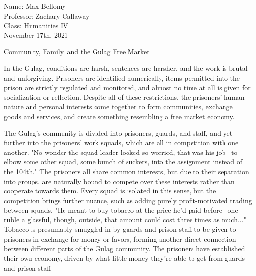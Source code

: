 \documentclass[12pt]{article}
\begin{document}
\begin{flushleft}

Name: Max Bellomy\\
Professor: Zachary Callaway\\
Class: Humanities IV\\
November 17th, 2021\\

\begin{center}
Community, Family, and the Gulag Free Market
\end{center}


\setlength{\parindent}{0.5in}


In the Gulag, conditions are harsh, sentences are harsher, and the work is brutal and unforgiving.
Prisoners are identified numerically, items permitted into the prison are strictly regulated and monitored, and almost no time at all is given for socialization or reflection.
Despite all of these restrictions, the prisoners' human nature and personal interests come together to form communities, exchange goods and services, and create something resembling a free market economy.

The Gulag's community is divided into prisoners, guards, and staff, and yet further into the prisoners' work squads, which are all in competition with one another.
"No wonder the squad leader looked so worried, that was his job-- to elbow some other squad, some bunch of suckers, into the assignment instead of the 104th."\footnotemark
The prisoners all share common interests, but due to their separation into groups, are naturally bound to compete over these interests rather than cooperate towards them.
Every squad is isolated in this sense, but the competition brings further nuance, such as adding purely profit-motivated trading between squads.
"He meant to buy tobacco at the price he'd paid before-- one ruble a glassful, though, outside, that amount could cost three times as much..."\footnotemark  
Tobacco is presumably smuggled in by guards and prison staff to be given to prisoners in exchange for money or favors, forming another direct connection between different parts of the Gulag community.
The prisoners have established their own economy, driven by what little money they're able to get from guards and prison staff



\end{flushleft}
\end{document}
